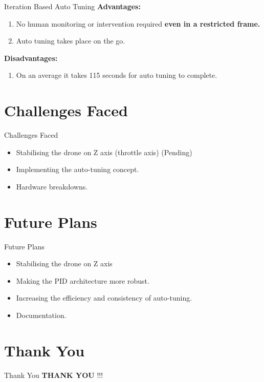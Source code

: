 \documentclass[10pt, a4paper]{beamer}
\begin{document}
\begin{frame}{Iteration Based Auto Tuning}
\textbf{Advantages:}\vspace{1em}
           	\begin{enumerate}
           	    \item No human monitoring or intervention required \textbf{even in a restricted frame.}
           	    \item Auto tuning takes place on the go.
           	\end{enumerate}
           	
           	\vspace{4em}
           	\textbf{Disadvantages:}\vspace{1em}
           	\begin{enumerate}
           	    \item On an average it takes 115 seconds for auto tuning to complete.
           	\end{enumerate}

\end{frame}

\section{Challenges Faced}
\begin{frame}{Challenges Faced}
	\begin{itemize}
\item Stabilising the drone on Z axis (throttle axis) (Pending) \vspace{1em}
\item Implementing the auto-tuning concept.\vspace{1em}
\item Hardware breakdowns.
    \end{itemize}
\end{frame}

\section{Future Plans}
\begin{frame}{Future Plans}
	\begin{itemize}
		\item Stabilising the drone on Z axis 
		\vspace{1em}
		\item Making the PID architecture more robust.
		\vspace{1em} 
		\item Increasing the efficiency and consistency of auto-tuning.
		\vspace{1em}
		\item Documentation.
		\vspace{1em}
	\end{itemize}
\end{frame}


\section{Thank You}
\begin{frame}{Thank You}
	\centering \textbf{THANK YOU} !!!
\end{frame}
\end{document}
